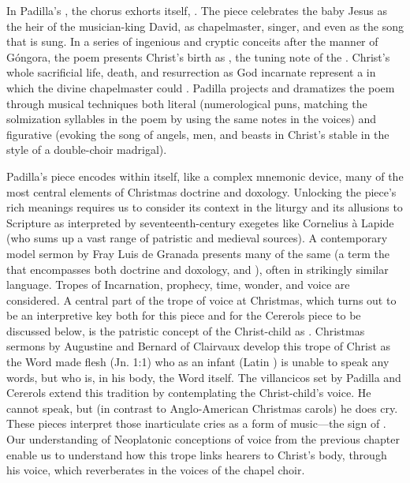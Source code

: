 \documentclass[tt]{vcbook-proposal}
\begin{document}
In Padilla's , the chorus exhorts itself, .
The piece celebrates the baby Jesus as the heir of the musician-king David, as chapelmaster, singer, and even as the song that is sung.
In a series of ingenious and cryptic conceits after the manner of Góngora, the poem presents Christ's birth as , the tuning note of the .
Christ's whole sacrificial life, death, and resurrection as God incarnate represent a  in which the divine chapelmaster could .
Padilla projects and dramatizes the poem through musical techniques both literal (numerological puns, matching the solmization syllables in the poem by using the same notes in the voices) and figurative (evoking the song of angels, men, and beasts in Christ's stable in the style of a double-choir madrigal).

Padilla's piece encodes within itself, like a complex mnemonic device, many of the most central elements of Christmas doctrine and doxology.
Unlocking the piece's rich meanings requires us to consider its context in the liturgy and its allusions to Scripture as interpreted by seventeenth-century exegetes like Cornelius à Lapide (who sums up a vast range of patristic and medieval sources). 
A contemporary model sermon by Fray Luis de Granada presents many of the same  (a term the that encompasses both doctrine and doxology,  and ), often in strikingly similar language.
Tropes of Incarnation, prophecy, time, wonder, and voice are considered.
A central part of the trope of voice at Christmas, which turns out to be an interpretive key both for this piece and for the Cererols piece to be discussed below, is the patristic concept of the Christ-child as . 
Christmas sermons by Augustine and Bernard of Clairvaux develop this trope of Christ as the Word made flesh (Jn. 1:1) who as an infant (Latin ) is unable to speak any words, but who is, in his body, the Word itself.
The villancicos set by Padilla and Cererols extend this tradition by contemplating the Christ-child's voice.
He cannot speak, but (in contrast to Anglo-American Christmas carols) he does cry.
These pieces interpret those inarticulate cries as a form of music---the sign of .
Our understanding of Neoplatonic conceptions of voice from the previous chapter enable us to understand how this trope links hearers to Christ's body, through his voice, which reverberates in the voices of the chapel choir.
\end{document}
